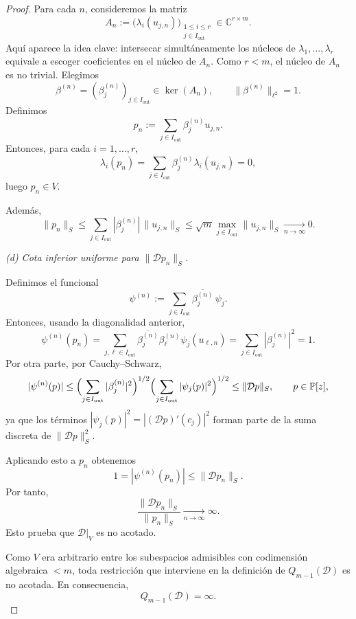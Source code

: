 \documentclass[12pt,a4paper]{article}
\theoremstyle{definition}
\theoremstyle{remark}
\newcommand{\Poly}{\mathbb{P}[z]}
\newcommand{\D}{\mathcal{D}}
\begin{document}
\begin{proof}
  Para cada $n$, consideremos la matriz
  \[
    A_n:=\bigl(\lambda_i(u_{j,n})\bigr)_{
    \substack{1\le i\le r\\ j\in I_{\mathrm{out}}}}
    \in \mathbb C^{r\times m}.
  \]
  Aquí aparece la idea clave: intersecar simultáneamente los núcleos de
  $\lambda_1,\dots,\lambda_r$ equivale a escoger coeficientes en el núcleo de $A_n$.
  Como $r<m$, el núcleo de $A_n$ es no trivial. Elegimos
  \[
    \beta^{(n)}=(\beta_j^{(n)})_{j\in I_{\mathrm{out}}}\in \ker(A_n),
    \qquad
    \|\beta^{(n)}\|_{\ell^2}=1.
  \]
  Definimos
  \[
    p_n:=\sum_{j\in I_{\mathrm{out}}}\beta_j^{(n)}u_{j,n}.
  \]
  Entonces, para cada $i=1,\dots,r$,
  \[
    \lambda_i(p_n)=\sum_{j\in I_{\mathrm{out}}}\beta_j^{(n)}\lambda_i(u_{j,n})=0,
  \]
  luego $p_n\in V$.

  Además,
  \[
    \|p_n\|_S
    \le
    \sum_{j\in I_{\mathrm{out}}} |\beta_j^{(n)}|\,\|u_{j,n}\|_S
    \le
    \sqrt m \max_{j\in I_{\mathrm{out}}}\|u_{j,n}\|_S
    \xrightarrow[n\to\infty]{}0.
  \]

  \smallskip
  \noindent
  \emph{(d) Cota inferior uniforme para $\|\D p_n\|_S$.}

  Definimos el funcional
  \[
    \psi^{(n)}:=\sum_{j\in I_{\mathrm{out}}}\overline{\beta_j^{(n)}}\,\psi_j.
  \]
  Entonces, usando la diagonalidad anterior,
  \[
    \psi^{(n)}(p_n)
    =
    \sum_{j,\ell\in I_{\mathrm{out}}}
    \overline{\beta_j^{(n)}}\beta_\ell^{(n)}\psi_j(u_{\ell,n})
    =
    \sum_{j\in I_{\mathrm{out}}}|\beta_j^{(n)}|^2
    =1.
  \]
  Por otra parte, por Cauchy--Schwarz,
  \[
    |\psi^{(n)}(p)|
    \le
    \Bigl(\sum_{j\in I_{\mathrm{out}}}|\beta_j^{(n)}|^2\Bigr)^{1/2}
    \Bigl(\sum_{j\in I_{\mathrm{out}}}|\psi_j(p)|^2\Bigr)^{1/2}
    \le
    \|\D p\|_S,
    \qquad p\in\Poly,
  \]
  ya que los términos $|\psi_j(p)|^2=|(\D p)'(c_j)|^2$ forman parte de la suma discreta
  de $\|\D p\|_S^2$.

  Aplicando esto a $p_n$ obtenemos
  \[
    1=|\psi^{(n)}(p_n)|\le \|\D p_n\|_S.
  \]
  Por tanto,
  \[
    \frac{\|\D p_n\|_S}{\|p_n\|_S}\xrightarrow[n\to\infty]{}\infty.
  \]
  Esto prueba que $\D|_V$ es no acotado.

  Como $V$ era arbitrario entre los subespacios admisibles con codimensión algebraica
  $<m$, toda restricción que interviene en la definición de $Q_{m-1}(\D)$ es no
  acotada. En consecuencia,
  \[
    Q_{m-1}(\D)=\infty.
  \]
\end{proof}
\end{document}
